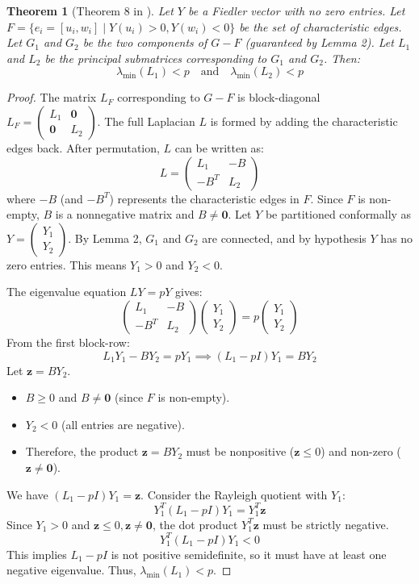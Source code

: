 \documentclass[12pt,a4paper]{report}
\theoremstyle{plain}
\newtheorem{theorem}{Theorem}[section]
\theoremstyle{definition}
\theoremstyle{remark}
\begin{document}
\begin{theorem}[Theorem 8 in \cite{main_paper}]
Let $Y$ be a Fiedler vector with no zero entries. Let $F = \{e_i = [u_i, w_i] \mid Y(u_i) > 0, Y(w_i) < 0\}$ be the set of characteristic edges. Let $G_1$ and $G_2$ be the two components of $G-F$ (guaranteed by Lemma 2). Let $L_1$ and $L_2$ be the principal submatrices corresponding to $G_1$ and $G_2$. Then:
$$ \lambda_{\min}(L_1) < p \quad \text{and} \quad \lambda_{\min}(L_2) < p $$
\end{theorem}
\begin{proof}
The matrix $L_F$ corresponding to $G-F$ is block-diagonal $L_F = \begin{pmatrix} L_1 & \mathbf{0} \\ \mathbf{0} & L_2 \end{pmatrix}$.
The full Laplacian $L$ is formed by adding the characteristic edges back. After permutation, $L$ can be written as:
$$ L = \begin{pmatrix} L_1 & -B \\ -B^T & L_2 \end{pmatrix} $$
where $-B$ (and $-B^T$) represents the characteristic edges in $F$. Since $F$ is non-empty, $B$ is a nonnegative matrix and $B \ne \mathbf{0}$.
Let $Y$ be partitioned conformally as $Y = \begin{pmatrix} Y_1 \\ Y_2 \end{pmatrix}$. By Lemma 2, $G_1$ and $G_2$ are connected, and by hypothesis $Y$ has no zero entries. This means $Y_1 > 0$ and $Y_2 < 0$.

The eigenvalue equation $LY = pY$ gives:
$$ \begin{pmatrix} L_1 & -B \\ -B^T & L_2 \end{pmatrix} \begin{pmatrix} Y_1 \\ Y_2 \end{pmatrix} = p \begin{pmatrix} Y_1 \\ Y_2 \end{pmatrix} $$
From the first block-row:
$$ L_1 Y_1 - B Y_2 = p Y_1 \implies (L_1 - pI)Y_1 = B Y_2 $$
Let $\bm{z} = B Y_2$.
\begin{itemize}
    \item $B \ge 0$ and $B \ne \mathbf{0}$ (since $F$ is non-empty).
    \item $Y_2 < 0$ (all entries are negative).
    \item Therefore, the product $\bm{z} = B Y_2$ must be nonpositive ($\bm{z} \le 0$) and non-zero ($\bm{z} \ne \bm{0}$).
\end{itemize}
We have $(L_1 - pI)Y_1 = \bm{z}$. Consider the Rayleigh quotient with $Y_1$:
$$ Y_1^T (L_1 - pI) Y_1 = Y_1^T \bm{z} $$
Since $Y_1 > 0$ and $\bm{z} \le 0, \bm{z} \ne \bm{0}$, the dot product $Y_1^T \bm{z}$ must be strictly negative.
$$ Y_1^T (L_1 - pI) Y_1 < 0 $$
This implies $L_1 - pI$ is not positive semidefinite, so it must have at least one negative eigenvalue. Thus, $\lambda_{\min}(L_1) < p$.


\end{proof}
\end{document}
